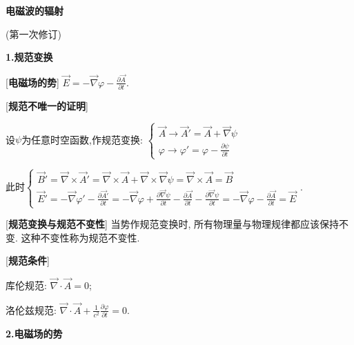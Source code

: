 


 \begin{center} 
 \Large \textbf{电磁波的辐射}\par
 (第一次修订)
\end{center}
 
\large 
\begin{center}
 \textbf{1.规范变换}
\end{center}

[\textbf{电磁场的势}] $\vec E=-\vec\nabla\varphi - \frac{\partial\vec A}{\partial t}$.\par

[\textbf{规范不唯一的证明}]\par
\qquad 设$\psi$为任意时空函数,作规范变换: $\begin{cases}\vec A\rightarrow\vec A' = \vec A+\vec\nabla\psi\\\varphi\rightarrow\varphi'=\varphi - \frac{\partial \psi}{\partial t}\end{cases}$\par
\qquad 此时$\begin{cases}\vec B'=\vec\nabla\times\vec A'=\vec\nabla\times\vec A+\vec\nabla\times\vec\nabla\psi=\vec\nabla\times\vec A=\vec B\\\vec E'=-\vec\nabla\varphi'-\frac{\partial \vec A'}{\partial t}=-\vec\nabla\varphi+\frac{\partial \vec\nabla\psi}{\partial t}-\frac{\partial\vec A}{\partial t}-\frac{\partial \vec\nabla\psi}{\partial t}=-\vec\nabla\varphi-\frac{\partial\vec A}{\partial t}=\vec E\end{cases}$.\par

[\textbf{规范变换与规范不变性}] 当势作规范变换时, 所有物理量与物理规律都应该保持不变. 这种不变性称为规范不变性.\par

[\textbf{规范条件}]\par
\qquad 库伦规范: $\vec\nabla\cdot\vec A=0$;\par
\qquad 洛伦兹规范: $\vec\nabla\cdot\vec A+\frac{1}{c^2}\frac{\partial\varphi}{\partial t}=0$.\par

\begin{center}
 \textbf{2.电磁场的势}
\end{center}

